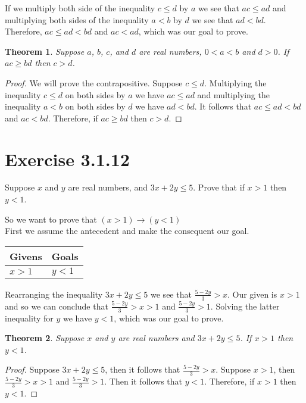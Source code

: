 \documentclass{article}
\newcommand{\n}{ \noindent }
\newtheorem*{theorem}{Theorem}  %
\begin{document}
\n If we multiply both side of the inequality $c \leq d$ by $a$ we see that $ac \leq ad$ and multiplying both sides of the inequality $a < b$ by $d$ we see that $ad < bd$. Therefore, $ac \leq ad < bd$ and $ac < ad$, which was our goal to prove.

\begin{theorem} Suppose $a$, $b$, $c$, and $d$ are real numbers, $0<a<b$ and $d>0$. If $ac \geq bd$ then $c>d$.
\end{theorem}
\begin{proof}
We will prove the contrapositive. Suppose $c \leq d$. Multiplying the inequality $c \leq d$ on both sides by $a$ we have $ac \leq ad$ and multiplying the inequality $a<b$ on both sides by $d$ we have $ad < bd$. It follows that $ac \leq ad < bd$ and $ac < bd$. Therefore, if $ac \geq bd$ then $c>d$.
\end{proof}

\section*{Exercise 3.1.12}
Suppose $x$ and $y$ are real numbers, and $3x + 2y \leq 5$. Prove that if $x>1$ then $y<1$.

\n So we want to prove that
$(x>1) \rightarrow (y<1)$ \\

\n First we assume the antecedent and make the consequent our goal.

\begin{table}[h]
\begin{tabular}{ll}
\hline
Givens & Goals   \\ \hline
$x > 1$ & $y<1$   \\ \hline
\end{tabular}
\end{table}

\n Rearranging the inequality $3x + 2y \leq 5$ we see that $\tfrac{5-2y}{3} > x$. Our given is $x>1$ and so we can conclude that $\tfrac{5-2y}{3} > x > 1$ and $\tfrac{5-2y}{3} > 1$. Solving the latter inequality for $y$ we have $y < 1$, which was our goal to prove.

\begin{theorem} Suppose $x$ and $y$ are real numbers and $3x + 2y \leq 5$. If $x>1$ then $y<1$.
\end{theorem}
\begin{proof}
Suppose $3x+2y \leq 5$, then it follows that $\tfrac{5-2y}{3} > x$. Suppose $x>1$, then $\tfrac{5-2y}{3} > x > 1$ and $\tfrac{5-2y}{3} > 1$. Then it follows that $y<1$. Therefore, if $x>1$ then $y<1$.
\end{proof}
\end{document}
